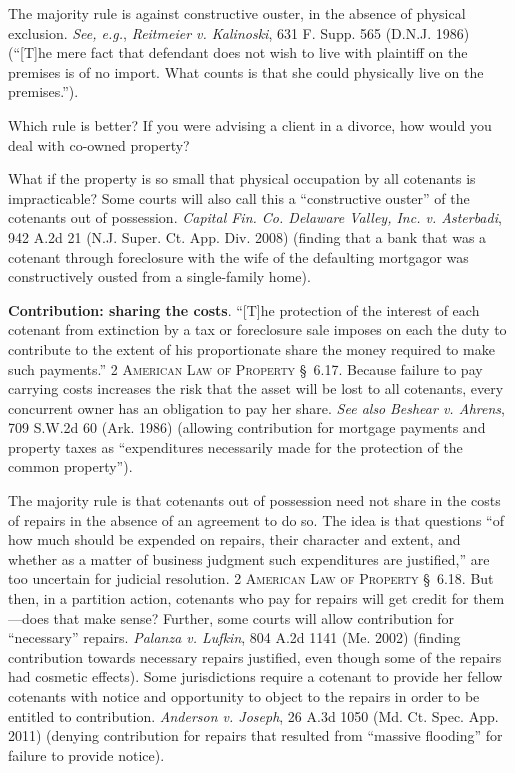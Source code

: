 The majority rule is against constructive ouster, in the absence of physical
exclusion. \emph{See, e.g.}, \emph{Reitmeier v. Kalinoski}, 631 F. Supp. 565
(D.N.J.
1986) (``[T]he mere fact that defendant does not wish to live with plaintiff on
the premises is of no import. What counts is that she could physically live on
the premises.'').



Which rule is better? If you were advising a client in a divorce, how would you
deal with co-owned property?



What if the property is so small that physical occupation by all cotenants is
impracticable? Some courts will also call this a ``constructive ouster'' of
the cotenants out of possession. \emph{Capital Fin. Co. Delaware Valley, Inc. v.
Asterbadi}, 942 A.2d 21 (N.J. Super. Ct. App. Div. 2008) (finding that a bank
that was a cotenant through foreclosure with the wife of the defaulting
mortgagor was constructively ousted from a single-family home).



\item \textbf{Contribution: sharing the costs}. ``[T]he protection of the
interest of each cotenant from extinction by a tax or foreclosure sale imposes
on each the duty to contribute to the extent of his proportionate share the
money required to make such payments.'' 2 \textsc{American Law of Property}
\S~6.17. Because failure to pay carrying costs increases the risk that the
asset will be lost to all cotenants, every concurrent owner has an obligation
to pay her share. \textit{See also} \emph{Beshear v. Ahrens}, 709 S.W.2d 60 (Ark.
1986) (allowing contribution for mortgage payments and property taxes as
``expenditures necessarily made for the protection of the common property'').


The majority rule is that cotenants out of possession need not share in the
costs of repairs in the absence of an agreement to do so. The idea is that
questions ``of how much should be expended on repairs, their character and
extent, and whether as a matter of business judgment such expenditures are
justified,'' are too uncertain for judicial resolution. 2 \textsc{American Law
of Property} \S~6.18. But then, in a partition action, cotenants who pay for
repairs will get credit for them---does that make sense? Further, some courts
will allow contribution for ``necessary'' repairs. \emph{Palanza v. Lufkin}, 804
A.2d 1141 (Me. 2002) (finding contribution towards necessary repairs justified,
even though some of the repairs had cosmetic effects). Some jurisdictions
require a cotenant to provide her fellow cotenants with notice and opportunity
to object to the repairs in order to be entitled to contribution. \emph{Anderson
v. Joseph}, 26 A.3d 1050 (Md. Ct. Spec. App. 2011) (denying contribution for
repairs that resulted from ``massive flooding'' for failure to provide notice).



